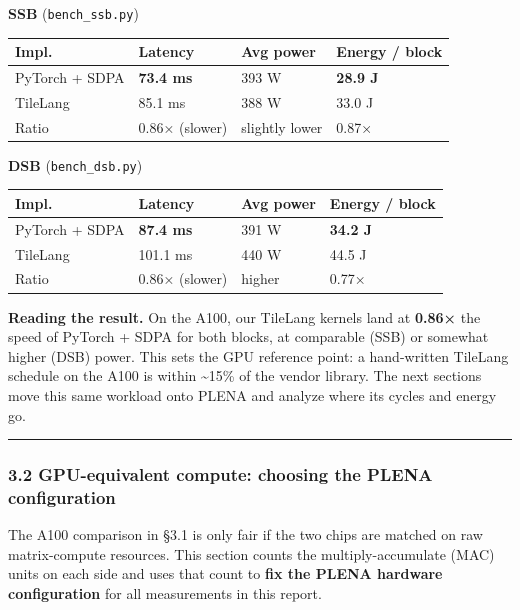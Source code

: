 \documentclass[
  10pt,
]{article}
\newcounter{none} %
\begin{document}
\textbf{SSB} (\texttt{bench\_ssb.py})

{\def\LTcaptype{none} %
\begin{longtable}[]{@{}llll@{}}
\toprule\noalign{}
Impl. & Latency & Avg power & Energy / block \\
\midrule\noalign{}
\endhead
\bottomrule\noalign{}
\endlastfoot
PyTorch + SDPA & \textbf{73.4 ms} & 393 W & \textbf{28.9 J} \\
TileLang & 85.1 ms & 388 W & 33.0 J \\
Ratio & 0.86× (slower) & slightly lower & 0.87× \\
\end{longtable}
}

\textbf{DSB} (\texttt{bench\_dsb.py})

{\def\LTcaptype{none} %
\begin{longtable}[]{@{}llll@{}}
\toprule\noalign{}
Impl. & Latency & Avg power & Energy / block \\
\midrule\noalign{}
\endhead
\bottomrule\noalign{}
\endlastfoot
PyTorch + SDPA & \textbf{87.4 ms} & 391 W & \textbf{34.2 J} \\
TileLang & 101.1 ms & 440 W & 44.5 J \\
Ratio & 0.86× (slower) & higher & 0.77× \\
\end{longtable}
}

\textbf{Reading the result.} On the A100, our TileLang kernels land at
\textbf{0.86×} the speed of PyTorch + SDPA for both blocks, at
comparable (SSB) or somewhat higher (DSB) power. This sets the GPU
reference point: a hand-written TileLang schedule on the A100 is within
\textasciitilde15\% of the vendor library. The next sections move this
same workload onto PLENA and analyze where its cycles and energy go.

\begin{center}\rule{0.5\linewidth}{0.5pt}\end{center}

\subsubsection{3.2 GPU-equivalent compute: choosing the PLENA
configuration}\label{gpu-equivalent-compute-choosing-the-plena-configuration}

The A100 comparison in §3.1 is only fair if the two chips are matched on
raw matrix-compute resources. This section counts the
multiply-accumulate (MAC) units on each side and uses that count to
\textbf{fix the PLENA hardware configuration} for all measurements in
this report.
\end{document}
